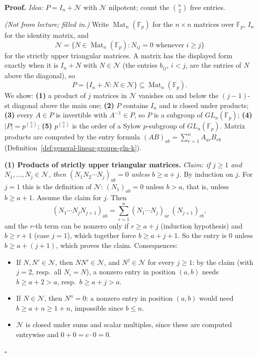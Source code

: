 \documentclass[11pt]{report}
\renewenvironment{proof}[1][Proof]{\noindent\textbf{#1.} }{\hfill$\square$\par\vspace{5pt}}
\begin{document}
\begin{proof}
\textit{Idea:} $P = I_n + \mathcal{N}$ with $\mathcal{N}$ nilpotent; count the $\binom{n}{2}$ free entries.\par
\textit{(Not from lecture; filled in.)} Write $\operatorname{Mat}_n(\mathbb{F}_p)$ for the $n \times n$ matrices over $\mathbb{F}_p$, $I_n$ for the identity matrix, and
\[ \mathcal{N} = \{ N \in \operatorname{Mat}_n(\mathbb{F}_p) : N_{ij} = 0 \text{ whenever } i \geq j \} \]
for the strictly upper triangular matrices. A matrix has the displayed form exactly when it is $I_n + N$ with $N \in \mathcal{N}$ (the entries $b_{ij}$, $i < j$, are the entries of $N$ above the diagonal), so
\[ P = \{ I_n + N : N \in \mathcal{N} \} \subseteq \operatorname{Mat}_n(\mathbb{F}_p). \]
We show: \textbf{(1)} a product of $j$ matrices in $\mathcal{N}$ vanishes on and below the $(j-1)$-st diagonal above the main one; \textbf{(2)} $P$ contains $I_n$ and is closed under products; \textbf{(3)} every $A \in P$ is invertible with $A^{-1} \in P$, so $P$ is a subgroup of $GL_n(\mathbb{F}_p)$; \textbf{(4)} $|P| = p^{\binom{n}{2}}$; \textbf{(5)} $p^{\binom{n}{2}}$ is the order of a Sylow $p$-subgroup of $GL_n(\mathbb{F}_p)$. Matrix products are computed by the entry formula $(AB)_{ab} = \sum_{r=1}^{n} A_{ar} B_{rb}$ (Definition~\ref{def:general-linear-groups-gln-k}).

\textbf{(1) Products of strictly upper triangular matrices.} \emph{Claim: if $j \geq 1$ and $N_1, \ldots, N_j \in \mathcal{N}$, then $(N_1 N_2 \cdots N_j)_{ab} = 0$ unless $b \geq a + j$.} By induction on $j$. For $j = 1$ this is the definition of $\mathcal{N}$: $(N_1)_{ab} = 0$ unless $b > a$, that is, unless $b \geq a + 1$. Assume the claim for $j$. Then
\[ (N_1 \cdots N_j N_{j+1})_{ab} = \sum_{r=1}^{n} (N_1 \cdots N_j)_{ar} \, (N_{j+1})_{rb}, \]
and the $r$-th term can be nonzero only if $r \geq a + j$ (induction hypothesis) and $b \geq r + 1$ (case $j = 1$), which together force $b \geq a + j + 1$. So the entry is $0$ unless $b \geq a + (j + 1)$, which proves the claim. Consequences:
\begin{itemize}
    \item If $N, N' \in \mathcal{N}$, then $NN' \in \mathcal{N}$, and $N^j \in \mathcal{N}$ for every $j \geq 1$: by the claim (with $j = 2$, resp.\ all $N_i = N$), a nonzero entry in position $(a, b)$ needs $b \geq a + 2 > a$, resp.\ $b \geq a + j > a$.
    \item If $N \in \mathcal{N}$, then $N^n = 0$: a nonzero entry in position $(a, b)$ would need $b \geq a + n \geq 1 + n$, impossible since $b \leq n$.
    \item $\mathcal{N}$ is closed under sums and scalar multiples, since these are computed entrywise and $0 + 0 = c \cdot 0 = 0$.
\end{itemize}


\end{proof}
\end{document}
